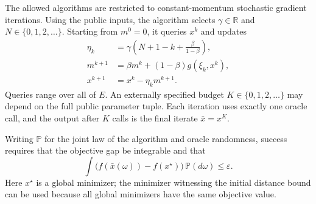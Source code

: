\documentclass[10pt]{article}
\theoremstyle{definition}
\begin{document}
The allowed algorithms are restricted to constant-momentum stochastic gradient iterations. Using the public inputs, the algorithm selects $\gamma\in\mathbb{R}$ and $N\in\{0,1,2,\ldots\}$. Starting from $m^0=0$, it queries $x^k$ and updates
\begin{align*}
\eta_k&=\gamma\left(N+1-k+\frac{\beta}{1-\beta}\right),\\
m^{k+1}&=\beta m^k+(1-\beta)g(\xi_k,x^k),\\
x^{k+1}&=x^k-\eta_k m^{k+1}.
\end{align*}
Queries range over all of $E$. An externally specified budget $K\in\{0,1,2,\ldots\}$ may depend on the full public parameter tuple. Each iteration uses exactly one oracle call, and the output after $K$ calls is the final iterate $\bar{x}=x^K$.

Writing $\mathbb{P}$ for the joint law of the algorithm and oracle randomness, success requires that the objective gap be integrable and that
\[
\int\bigl(f(\bar{x}(\omega))-f(x^\star)\bigr)\,\mathbb{P}(d\omega)
\leq\varepsilon.
\]
Here $x^\star$ is a global minimizer; the minimizer witnessing the initial distance bound can be used because all global minimizers have the same objective value.
\end{document}
